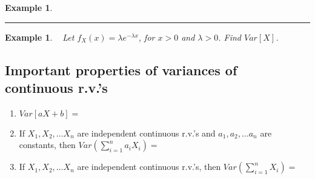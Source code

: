 \documentclass[12pt]{amsart}
\newtheorem{example}[theorem]{Example}
\newcommand\gl{\lambda}
\newcommand\pdfX{f_X(x)}
\begin{document}
{\begin{example}
\end{example}

\vspace{4cm}
\hrule
\vspace{.5cm}

\begin{example}\label{29_V_Exp}\ \newline
Let $\pdfX = \gl e^{-\gl x}$, for $x > 0$ and $\gl > 0$. Find $Var[X]$.

\end{example}

\vspace{4cm}


\subsection{Important properties of variances  of continuous r.v.'s}\hspace*{\fill}%

\begin{enumerate}
\item $Var[aX+b] = $

\vfill

%


\item If $X_1, X_2, \ldots X_n$ are independent continuous r.v.'s and $a_1, a_2, \ldots a_n$ are constants, then $Var(\sum_{i=1}^{n} a_i X_i) = $


\vfill

\item If $X_1, X_2, \ldots X_n$ are independent continuous r.v.'s, then \newline $Var(\sum_{i=1}^{n} X_i) = $

\vfill
\end{enumerate}

\newpage


}
\end{document}

